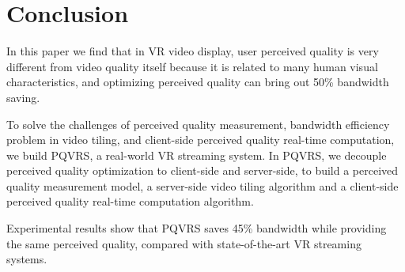 \section{Conclusion}

In this paper we find that in VR video display, user perceived quality is very different from video quality itself because it is related to many human visual characteristics, and optimizing perceived quality can bring out 50\% bandwidth saving.

To solve the challenges of perceived quality measurement, bandwidth efficiency problem in video tiling, and client-side perceived quality real-time computation, we build PQVRS, a real-world VR streaming system. In PQVRS, we decouple perceived quality optimization to client-side and server-side, to build a perceived quality measurement model, a server-side video tiling algorithm and a client-side perceived quality real-time computation algorithm.

Experimental results show that PQVRS saves 45\% bandwidth while providing the same perceived quality, compared with state-of-the-art VR streaming systems.
